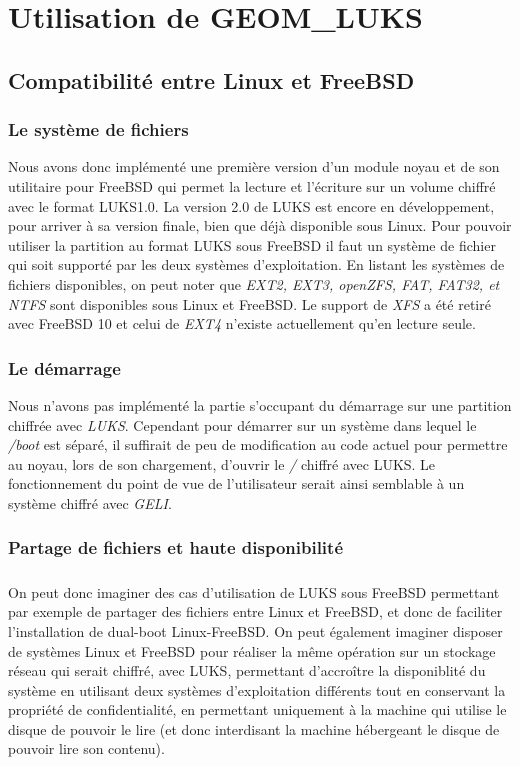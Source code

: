 \chapter{Utilisation de GEOM\_LUKS}

\section{Compatibilité entre Linux et FreeBSD}

\subsection{Le système de fichiers}
Nous avons donc implémenté une première version d'un module noyau et de son
utilitaire pour FreeBSD qui permet la lecture et l'écriture sur un volume chiffré
avec le format LUKS1.0. La version 2.0 de LUKS est encore en développement,
pour arriver à sa version finale, bien que déjà disponible sous Linux. Pour
pouvoir utiliser la partition au format LUKS sous FreeBSD il faut un système de
fichier qui soit supporté par les deux systèmes d'exploitation. En listant
les systèmes de fichiers disponibles, on peut noter que {\em EXT2, EXT3, openZFS,
FAT, FAT32, et NTFS} sont disponibles sous Linux et FreeBSD. Le support de {\em
XFS} a été retiré avec FreeBSD 10 et celui de {\em EXT4} n'existe actuellement
qu'en lecture seule.

\subsection{Le démarrage}
Nous n'avons pas implémenté la partie s'occupant du démarrage sur une partition
chiffrée avec {\em LUKS}. Cependant pour démarrer sur un système dans lequel le
{\em /boot} est séparé, il suffirait de peu de modification au code actuel pour
permettre au noyau, lors de son chargement, d'ouvrir le {\em /} chiffré avec
LUKS. Le fonctionnement du point de vue de l'utilisateur serait ainsi semblable
à un système chiffré avec \textit{GELI}.

\subsection{Partage de fichiers et haute disponibilité}
\paragraph{}
On peut donc imaginer des cas d'utilisation de LUKS sous FreeBSD permettant par
exemple de partager des fichiers entre Linux et FreeBSD, et donc de faciliter
l'installation de dual-boot Linux-FreeBSD. On peut également imaginer disposer
de systèmes Linux et FreeBSD pour réaliser la même opération sur un stockage
réseau qui serait chiffré, avec LUKS, permettant d'accroître la disponiblité du
système en utilisant deux systèmes d'exploitation différents tout en conservant
la propriété de confidentialité, en permettant uniquement à la machine qui
utilise le disque de pouvoir le lire (et donc interdisant la machine hébergeant
le disque de pouvoir lire son contenu).
